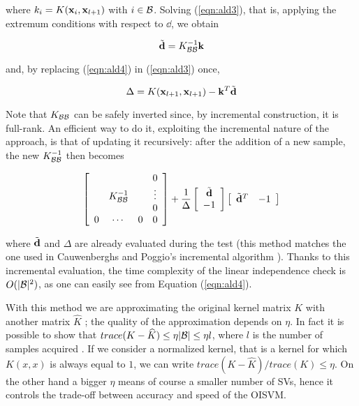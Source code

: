 \noindent where $k_i = K(\mathbf{x}_i,\mathbf{x}_{l+1})$ with $i \in \mathcal{B}$. Solving
(\ref{eqn:ald3}), that is, applying the extremum conditions with
respect to $\dd$, we obtain

\begin{equation} \label{eqn:ald4}
  \tilde{\mathbf{d}} = K_{\mathcal{B}\mathcal{B}}^{-1} \mathbf{k} \\
\end{equation}

\noindent and, by replacing (\ref{eqn:ald4}) in (\ref{eqn:ald3}) once,

\begin{equation} \label{eqn:ald5}
  \Delta = K(\mathbf{x}_{l+1},\mathbf{x}_{l+1}) - \mathbf{k}^T \tilde{\mathbf{d}}
\end{equation}

Note that $K_{\mathcal{B}\mathcal{B}}$ can be safely inverted since, by incremental
construction, it is full-rank. An efficient way to do it, exploiting
the incremental nature of the approach, is that of updating it
recursively: after the addition of a new sample, the new
$K_{\mathcal{B}\mathcal{B}}^{-1}$ then becomes

\begin{equation} \label{eqn:inv_upd}
  \left[\begin{array}{cccc}
       &               &   & 0 \\
       & K_{\mathcal{B}\mathcal{B}}^{-1} &   & \vdots \\
       &               &   & 0 \\
     0 &       \cdots  & 0 & 0
  \end{array}\right]
  +
  \frac{1}{\Delta}
  \left[\begin{array}{c}
    \tilde{\mathbf{d}} \\
    -1
  \end{array}\right]
  \left[\begin{array}{cc}
    \tilde{\mathbf{d}}^T & -1
  \end{array}\right]
\end{equation}

\noindent where $\tilde{\mathbf{d}}$ and $\Delta$ are already evaluated during the
test (this method matches the one used in Cauwenberghs and Poggio's
incremental algorithm \cite{CauwenberghsP00}). Thanks to this
incremental evaluation, the time complexity of the linear independence
check is $O(|\mathcal{B}|^2)$, as one can easily see from Equation
(\ref{eqn:ald4}).

With this method we are approximating the original kernel matrix $K$
with another matrix $\widehat{K}$ \cite{BachJordan2005};
the quality of the approximation
depends on $\eta$. In fact it is possible to show that
$trace(K-\widehat{K}) \leq \eta |\mathcal{B}| \leq \eta l$, where $l$ is the number
of samples acquired \cite{engel2004}. If we consider a normalized kernel,
that is a kernel for which $K(x,x)$ is always equal to $1$, we can write
$trace(K-\widehat{K})/trace(K) \leq \eta$.
On the other hand a bigger $\eta$ means of course a smaller number
of SVs, hence it controls the trade-off between accuracy and
speed of the OISVM.


